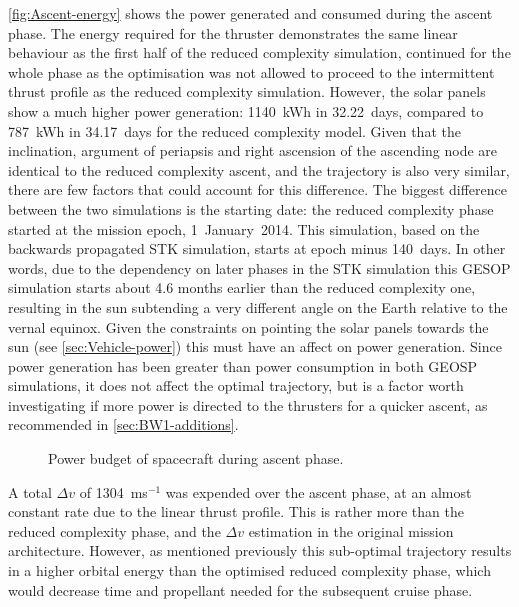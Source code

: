 \autoref{fig:Ascent-energy} shows the power generated and consumed during the ascent phase. The energy required for the thruster demonstrates the same linear behaviour as the first half of the reduced complexity simulation, continued for the whole phase as the optimisation was not allowed to proceed to the intermittent thrust profile as the reduced complexity simulation. However, the solar panels show a much higher power generation: 1140~kWh in 32.22~days, compared to 787~kWh in 34.17~days for the reduced complexity model. Given that the inclination, argument of periapsis and right ascension of the ascending node are identical to the reduced complexity ascent, and the trajectory is also very similar, there are few factors that could account for this difference. The biggest difference between the two simulations is the starting date: the reduced complexity phase started at the mission epoch, 1~January~2014. This simulation, based on the backwards propagated STK simulation, starts at epoch minus 140~days. In other words, due to the dependency on later phases in the STK simulation this GESOP simulation starts about 4.6 months earlier than the reduced complexity one, resulting in the sun subtending a very different angle on the Earth relative to the vernal equinox. Given the constraints on pointing the solar panels towards the sun (see \autoref{sec:Vehicle-power}) this must have an affect on power generation. Since power generation has been greater than power consumption in both GEOSP simulations, it does not affect the optimal trajectory, but is a factor worth investigating if more power is directed to the thrusters for a quicker ascent, as recommended in \autoref{sec:BW1-additions}.

\begin{figure}
\centering
\def\svgwidth{\figurewidth}

\caption{Power budget of spacecraft during ascent phase.} \label{fig:Ascent-energy}
\end{figure}

A total $\Delta v$ of 1304~ms$^{-1}$ was expended over the ascent phase, at an almost constant rate due to the linear thrust profile. This is rather more than the reduced complexity phase, and the $\Delta v$ estimation in the original mission architecture. However, as mentioned previously this sub-optimal trajectory results in a higher orbital energy than the optimised reduced complexity phase, which would decrease time and propellant needed for the subsequent cruise phase.


